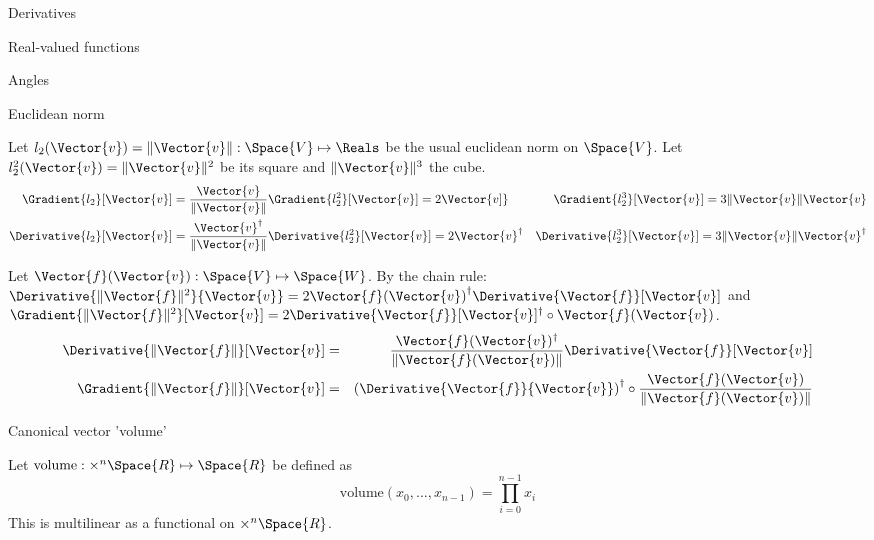 \begin{plSection}{Derivatives}
\begin{plSection}{Real-valued functions}
\begin{plSection}{Angles}
\end{plSection}%
\begin{plSection}{Euclidean norm}
\label{sec:derivatives-of-euclidean-norm}

Let 
$l_2(\Vector{v}) = \| \Vector{v} \|: \Space{V} \mapsto \Reals$
be the usual euclidean norm on $\Space{V}$.
Let $l_2^2(\Vector{v}) = \| \Vector{v}  \|^2 $
be its square and $ \| \Vector{v}  \|^3$ the cube.
\begin{eqnarray}
\label{eq:l2-gradient}
\Gradient{l_2}[\Vector{v}]
 = \frac{ \Vector{v} }{\| \Vector{v}  \|} &
\Gradient{l_2^2}[\Vector{v}] 
=  2\Vector{v]}&
\Gradient{l_2^3}[\Vector{v}]
 = 3 \| \Vector{v}  \| \Vector{v} \\
\Derivative{l_2}[\Vector{v}] 
= \frac{ \Vector{v}^\dagger }{ \| \Vector{v}  \|} &
\Derivative{l_2^2}[\Vector{v}] = 2\Vector{v}^\dagger &
\Derivative{l_2^3}[\Vector{v}] 
= 3 \| \Vector{v}  \| \Vector{v}^\dagger \nonumber
\end{eqnarray}

Let $\Vector{f}(\Vector{v}) : \Space{V} \mapsto \Space{W}$.
By the chain rule:
$\Derivative{\| \Vector{f} \|^2}{\Vector{v}}  
=  2 {\Vector{f}(\Vector{v})}^{\dagger} 
\Derivative{\Vector{f}}[\Vector{v}] $
and
$\Gradient{\| \Vector{f} \|^2}[\Vector{v}]  
=  2 \Derivative{\Vector{f}}[\Vector{v}]^\dagger 
\circ \Vector{f}(\Vector{v})$.
\begin{eqnarray}
\label{eq:norm_derivative}
\Derivative{\| \Vector{f} \|}[\Vector{v}]
& = &
\frac{\Vector{f}(\Vector{v})^\dagger}
{\| \Vector{f}(\Vector{v}) \|} 
\Derivative{\Vector{f}}[\Vector{v}]  \\
\Gradient{\| \Vector{f} \|}[\Vector{v}]
& = &
\left(
\Derivative{\Vector{f}}{\Vector{v}}\right)^\dagger 
\circ 
\frac{\Vector{f}(\Vector{v})}{\| \Vector{f}(\Vector{v}) \|}
\label{eq:norm_gradient}
\end{eqnarray}

\end{plSection}%
\begin{plSection}{Canonical vector 'volume'}
\label{sec:Derivative-of-canonical-vector-volume}

Let $\text{volume} : \times^{n} \Space{R} \mapsto \Space{R}$ 
be defined as
\begin{equation}
\text{volume} \left( x_0 , \ldots , x_{n-1} \right) = \prod_{i=0}^{n-1} x_i
\end{equation}
This is multilinear as a functional on $\times^{n} \Space{R}$.


\end{plSection}
\end{plSection}
\end{plSection}

